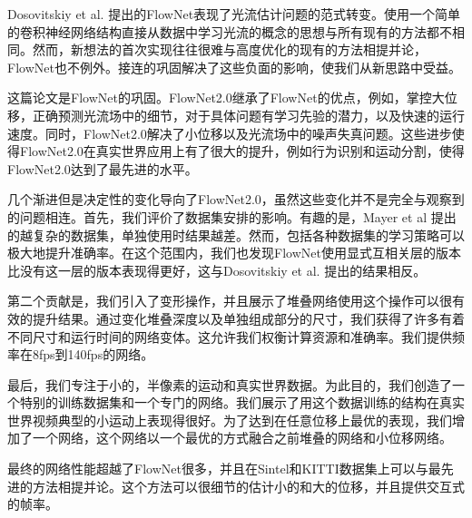 Dosovitskiy et al. \cite{dosovitskiy2015flownet} 提出的FlowNet表现了光流估计问题的范式转变。使用一个简单的卷积神经网络结构直接从数据中学习光流的概念的思想与所有现有的方法都不相同。然而，新想法的首次实现往往很难与高度优化的现有的方法相提并论，FlowNet也不例外。接连的巩固解决了这些负面的影响，使我们从新思路中受益。
\par
这篇论文是FlowNet的巩固。FlowNet2.0继承了FlowNet的优点，例如，掌控大位移，正确预测光流场中的细节，对于具体问题有学习先验的潜力，以及快速的运行速度。同时，FlowNet2.0解决了小位移以及光流场中的噪声失真问题。这些进步使得FlowNet2.0在真实世界应用上有了很大的提升，例如行为识别和运动分割，使得FlowNet2.0达到了最先进的水平。
\par
几个渐进但是决定性的变化导向了FlowNet2.0，虽然这些变化并不是完全与观察到的问题相连。首先，我们评价了数据集安排的影响。有趣的是，Mayer et al \cite{Mayer2016A} 提出的越复杂的数据集，单独使用时结果越差。然而，包括各种数据集的学习策略可以极大地提升准确率。在这个范围内，我们也发现FlowNet使用显式互相关层的版本比没有这一层的版本表现得更好，这与Dosovitskiy et al. \cite{dosovitskiy2015flownet}提出的结果相反。
\par
第二个贡献是，我们引入了变形操作，并且展示了堆叠网络使用这个操作可以很有效的提升结果。通过变化堆叠深度以及单独组成部分的尺寸，我们获得了许多有着不同尺寸和运行时间的网络变体。这允许我们权衡计算资源和准确率。我们提供频率在8fps到140fps的网络。
\par
最后，我们专注于小的，半像素的运动和真实世界数据。为此目的，我们创造了一个特别的训练数据集和一个专门的网络。我们展示了用这个数据训练的结构在真实世界视频典型的小运动上表现得很好。为了达到在任意位移上最优的表现，我们增加了一个网络，这个网络以一个最优的方式融合之前堆叠的网络和小位移网络。
\par
最终的网络性能超越了FlowNet很多，并且在Sintel和KITTI数据集上可以与最先进的方法相提并论。这个方法可以很细节的估计小的和大的位移，并且提供交互式的帧率。










